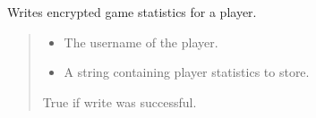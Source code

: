 \documentclass[letterpaper,10pt,english]{sphinxmanual}
\begin{document}

\begin{fulllineitems}
\label{\detokenize{modules:Database_Logic.write_statistics}}
\pysigstartsignatures
{}
\pysigstopsignatures
\sphinxAtStartPar
Writes encrypted game statistics for a player.
\begin{quote}\begin{description}
\begin{itemize}
\item {} 
\sphinxAtStartPar
{} \textendash{} The username of the player.

\item {} 
\sphinxAtStartPar
{} \textendash{} A string containing player statistics to store.

\end{itemize}

\sphinxAtStartPar
True if write was successful.

\end{description}\end{quote}

\end{fulllineitems}



\renewcommand{\indexname}{Python Module Index}
\begin{sphinxtheindex}
\let\bigletter\sphinxstyleindexlettergroup
\bigletter{d}
\item\relax{}
\indexspace
\bigletter{g}
\item\relax{}
\item\relax{}
\end{sphinxtheindex}

\renewcommand{\indexname}{Index}
\printindex
\end{document}
